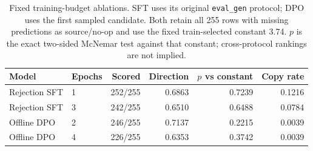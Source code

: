 \begin{table}[t]
\centering
\caption{Fixed training-budget ablations. SFT uses its original \texttt{eval\_gen} protocol; DPO uses the first sampled candidate. Both retain all 255 rows with missing predictions as source/no-op and use the fixed train-selected constant 3.74. $p$ is the exact two-sided McNemar test against that constant; cross-protocol rankings are not implied.}
\label{tab:training_budget}
\small
\begin{tabular}{@{}llrrrr@{}}
\toprule
Model & Epochs & Scored & Direction & $p$ vs constant & Copy rate \\
\midrule
Rejection SFT & 1 & 252/255 & 0.6863 & 0.7239 & 0.1216 \\
Rejection SFT & 3 & 242/255 & 0.6510 & 0.6488 & 0.0784 \\
\midrule
Offline DPO & 2 & 246/255 & 0.7137 & 0.2215 & 0.0039 \\
Offline DPO & 4 & 226/255 & 0.6353 & 0.3742 & 0.0039 \\
\bottomrule
\end{tabular}
\end{table}

